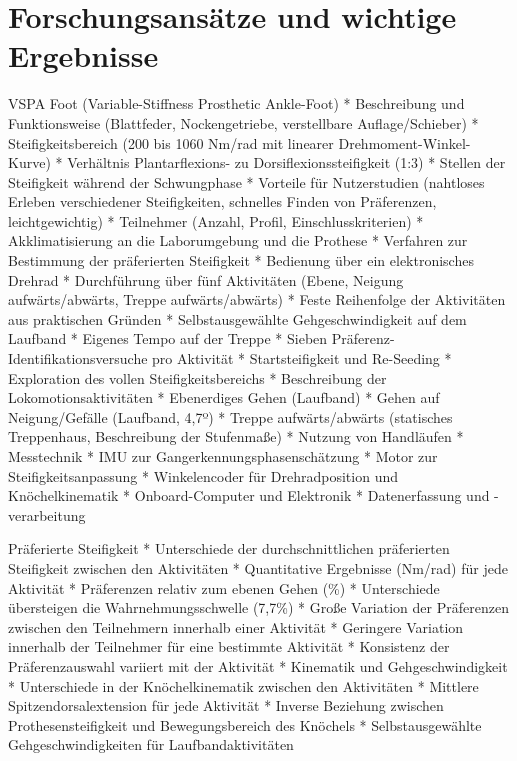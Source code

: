 \documentclass{SeminarV2}
\begin{document}
\section{Forschungsansätze und wichtige Ergebnisse}
VSPA Foot (Variable-Stiffness Prosthetic Ankle-Foot) *   Beschreibung und Funktionsweise (Blattfeder, Nockengetriebe, verstellbare Auflage/Schieber) *   Steifigkeitsbereich (200 bis 1060 Nm/rad mit linearer Drehmoment-Winkel-Kurve) *   Verhältnis Plantarflexions- zu Dorsiflexionssteifigkeit (1:3) *   Stellen der Steifigkeit während der Schwungphase *   Vorteile für Nutzerstudien (nahtloses Erleben verschiedener Steifigkeiten, schnelles Finden von Präferenzen, leichtgewichtig) *   Teilnehmer (Anzahl, Profil, Einschlusskriterien) *   Akklimatisierung an die Laborumgebung und die Prothese *   Verfahren zur Bestimmung der präferierten Steifigkeit *   Bedienung über ein elektronisches Drehrad *   Durchführung über fünf Aktivitäten (Ebene, Neigung aufwärts/abwärts, Treppe aufwärts/abwärts) *   Feste Reihenfolge der Aktivitäten aus praktischen Gründen *   Selbstausgewählte Gehgeschwindigkeit auf dem Laufband *   Eigenes Tempo auf der Treppe *   Sieben Präferenz-Identifikationsversuche pro Aktivität *   Startsteifigkeit und Re-Seeding *   Exploration des vollen Steifigkeitsbereichs *   Beschreibung der Lokomotionsaktivitäten *   Ebenerdiges Gehen (Laufband) *   Gehen auf Neigung/Gefälle (Laufband, 4,7º) *   Treppe aufwärts/abwärts (statisches Treppenhaus, Beschreibung der Stufenmaße) *   Nutzung von Handläufen *   Messtechnik *   IMU zur Gangerkennungsphasenschätzung *   Motor zur Steifigkeitsanpassung *   Winkelencoder für Drehradposition und Knöchelkinematik *   Onboard-Computer und Elektronik *   Datenerfassung und -verarbeitung
 
Präferierte Steifigkeit *   Unterschiede der durchschnittlichen präferierten Steifigkeit zwischen den Aktivitäten *   Quantitative Ergebnisse (Nm/rad) für jede Aktivität *   Präferenzen relativ zum ebenen Gehen (\%) *   Unterschiede übersteigen die Wahrnehmungsschwelle (7,7\%) *   Große Variation der Präferenzen zwischen den Teilnehmern innerhalb einer Aktivität *   Geringere Variation innerhalb der Teilnehmer für eine bestimmte Aktivität *   Konsistenz der Präferenzauswahl variiert mit der Aktivität *   Kinematik und Gehgeschwindigkeit *   Unterschiede in der Knöchelkinematik zwischen den Aktivitäten *   Mittlere Spitzendorsalextension für jede Aktivität *   Inverse Beziehung zwischen Prothesensteifigkeit und Bewegungsbereich des Knöchels *   Selbstausgewählte Gehgeschwindigkeiten für Laufbandaktivitäten
\end{document}
